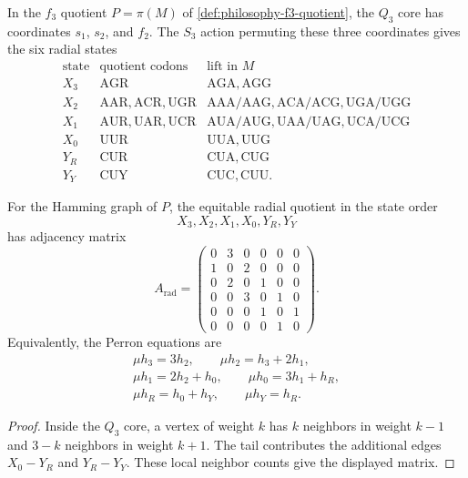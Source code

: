 \begin{definition}
\label{def:philosophy-radial-quotient-states}
In the $f_{3}$ quotient $P=\pi(M)$ of
\autoref{def:philosophy-f3-quotient}, the $Q_{3}$ core has coordinates
$s_{1}$, $s_{2}$, and $f_{2}$. The $S_{3}$ action permuting these three
coordinates gives the six radial states
$$
\begin{array}{c|c|c}
  \text{state} & \text{quotient codons} & \text{lift in }M\\
  \hline
  X_{3} & \mathrm{AGR} & \mathrm{AGA},\mathrm{AGG}\\
  X_{2} & \mathrm{AAR},\mathrm{ACR},\mathrm{UGR}
    & \mathrm{AAA}/\mathrm{AAG},\mathrm{ACA}/\mathrm{ACG},
      \mathrm{UGA}/\mathrm{UGG}\\
  X_{1} & \mathrm{AUR},\mathrm{UAR},\mathrm{UCR}
    & \mathrm{AUA}/\mathrm{AUG},\mathrm{UAA}/\mathrm{UAG},
      \mathrm{UCA}/\mathrm{UCG}\\
  X_{0} & \mathrm{UUR} & \mathrm{UUA},\mathrm{UUG}\\
  Y_{R} & \mathrm{CUR} & \mathrm{CUA},\mathrm{CUG}\\
  Y_{Y} & \mathrm{CUY} & \mathrm{CUC},\mathrm{CUU}.
\end{array}
$$
\end{definition}

\begin{theorem}
\label{thm:philosophy-radial-adjacency-matrix}
For the Hamming graph of $P$, the equitable radial quotient in the
state order
$$
  X_{3},X_{2},X_{1},X_{0},Y_{R},Y_{Y}
$$
has adjacency matrix
$$
  A_{\mathrm{rad}}
  =
  \begin{pmatrix}
    0&3&0&0&0&0\\
    1&0&2&0&0&0\\
    0&2&0&1&0&0\\
    0&0&3&0&1&0\\
    0&0&0&1&0&1\\
    0&0&0&0&1&0
  \end{pmatrix}.
$$
Equivalently, the Perron equations are
$$
\begin{gathered}
  \mu h_{3}=3h_{2},\qquad
  \mu h_{2}=h_{3}+2h_{1},\\
  \mu h_{1}=2h_{2}+h_{0},\qquad
  \mu h_{0}=3h_{1}+h_{R},\\
  \mu h_{R}=h_{0}+h_{Y},\qquad
  \mu h_{Y}=h_{R}.
\end{gathered}
$$
\end{theorem}
\begin{proof}
Inside the $Q_{3}$ core, a vertex of weight $k$ has $k$ neighbors in
weight $k-1$ and $3-k$ neighbors in weight $k+1$. The tail contributes
the additional edges $X_{0}-Y_{R}$ and $Y_{R}-Y_{Y}$. These local
neighbor counts give the displayed matrix.
\end{proof}

